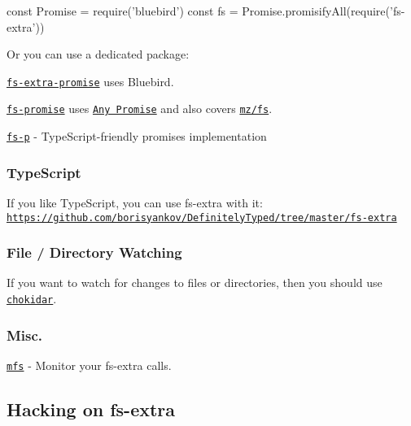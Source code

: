 \begin{DoxyCode}
const Promise = require('bluebird')
const fs = Promise.promisifyAll(require('fs-extra'))
\end{DoxyCode}


Or you can use a dedicated package\+:


\begin{DoxyItemize}
\item \href{https://github.com/overlookmotel/fs-extra-promise}{\tt {\ttfamily fs-\/extra-\/promise}} uses Bluebird.
\item \href{https://github.com/kevinbeaty/fs-promise}{\tt {\ttfamily fs-\/promise}} uses \href{https://github.com/kevinbeaty/any-promise}{\tt Any Promise} and also covers \href{https://github.com/normalize/mz/blob/master/fs.js}{\tt {\ttfamily mz/fs}}.
\item \href{https://github.com/grammarly/fs-p}{\tt {\ttfamily fs-\/p}} -\/ Type\+Script-\/friendly promises implementation
\end{DoxyItemize}

\subsubsection*{Type\+Script}

If you like Type\+Script, you can use {\ttfamily fs-\/extra} with it\+: \href{https://github.com/borisyankov/DefinitelyTyped/tree/master/fs-extra}{\tt https\+://github.\+com/borisyankov/\+Definitely\+Typed/tree/master/fs-\/extra}

\subsubsection*{File / Directory Watching}

If you want to watch for changes to files or directories, then you should use \href{https://github.com/paulmillr/chokidar}{\tt chokidar}.

\subsubsection*{Misc.}


\begin{DoxyItemize}
\item \href{https://github.com/cadorn/mfs}{\tt mfs} -\/ Monitor your fs-\/extra calls.
\end{DoxyItemize}

\subsection*{Hacking on fs-\/extra }

